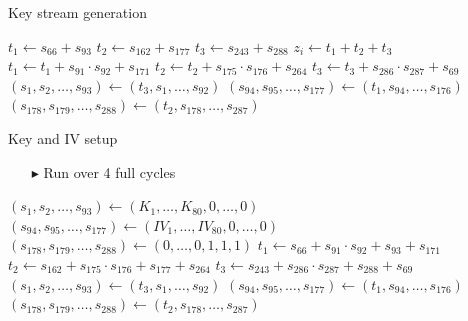 \documentclass[10pt, compress]{beamer}
\begin{document}
\begin{frame}{Key stream generation}
\begin{center}
\begin{minipage}{\textwidth}
\begin{algorithm}[H]
\begin{algorithmic}[1]
 
\State $t_1 \gets s_{66} + s_{93}$
\State $t_2 \gets s_{162} + s_{177}$
\State $t_3 \gets s_{243} + s_{288}$
\State
\State $z_i \gets t_1 + t_2 + t_3$
\State
\State $t_1 \gets t_1 + s_{91} \cdot s_{92} + s_{171}$
\State $t_2 \gets t_2 + s_{175} \cdot s_{176} + s_{264}$
\State $t_3 \gets t_3 + s_{286} \cdot s_{287} + s_{69}$
\State
\State $(s_1,s_2,\dots,s_{93}) \gets (t_3,s_1,\dots,s_{92})$ 
\State $(s_{94},s_{95},\dots,s_{177}) \gets (t_1,s_{94},\dots,s_{176})$ 
\State $(s_{178},s_{179},\dots,s_{288}) \gets (t_2,s_{178},\dots,s_{287})$ 
\EndFor
\end{algorithmic}
\end{algorithm}
\end{minipage}
\end{center}
\end{frame}

\begin{frame}{Key and IV setup}
\begin{itemize}
\item[$\blacktriangleright$] Run over 4 full cycles
\end{itemize}
\begin{center}
\begin{minipage}{\textwidth}
\begin{algorithm}[H]
\begin{algorithmic}[1]
\State $(s_1,s_2,\dots,s_{93}) \gets (K_1,\dots,K_{80},0,\dots,0)$ 
\State $(s_{94},s_{95},\dots,s_{177}) \gets (IV_1,\dots,IV_{80},0,\dots,0)$ 
\State $(s_{178},s_{179},\dots,s_{288}) \gets (0,\dots,0,1,1,1)$ 
\State
{}
\State $t_1 \gets s_{66} + s_{91} \cdot s_{92} + s_{93} + s_{171}$
\State $t_2 \gets s_{162} + s_{175} \cdot s_{176} + s_{177} + s_{264}$
\State $t_3 \gets s_{243} + s_{286} \cdot s_{287} + s_{288}+ s_{69}$
\State
\State $(s_1,s_2,\dots,s_{93}) \gets (t_3,s_1,\dots,s_{92})$ 
\State $(s_{94},s_{95},\dots,s_{177}) \gets (t_1,s_{94},\dots,s_{176})$ 
\State $(s_{178},s_{179},\dots,s_{288}) \gets (t_2,s_{178},\dots,s_{287})$ 
\EndFor
\end{algorithmic}
\end{algorithm}
\end{minipage}
\end{center}
\end{frame}
\end{document}
